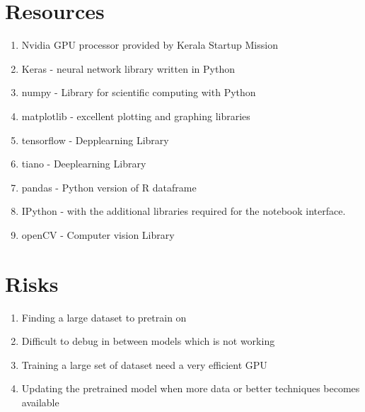 \documentclass[paper=a4, fontsize=11pt]{scrartcl}
\numberwithin{equation}{section}		%
\numberwithin{figure}{section}			%
\numberwithin{table}{section}				%
\begin{document}
\section{Resources}
\begin{enumerate}
	\item Nvidia GPU processor provided by Kerala Startup Mission
	\item Keras - neural network library written in Python
	\item numpy - Library for scientific computing with Python
	\item matplotlib - excellent plotting and graphing libraries
	\item tensorflow - Depplearning Library
	\item tiano - Deeplearning Library
	\item pandas - Python version of R dataframe
	\item IPython - with the additional libraries required for the notebook interface.
	\item openCV - Computer vision Library
\end{enumerate}

\section{Risks}
\begin{enumerate}
    \item Finding a large dataset to pretrain on
    \item Difficult to debug in between models which is not working
    \item Training a large set of dataset need a very efficient GPU
    \item Updating the pretrained model when more data or better techniques becomes available

\end{enumerate}



\end{document}
